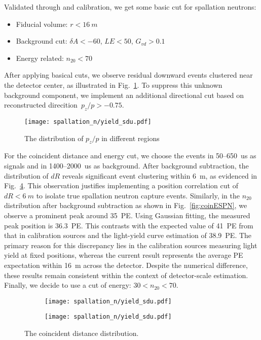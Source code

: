 Validated through  and  calibration, we get some basic cut for spallation neutrons:
\begin{itemize}
	\item Fiducial volume: $r<\SI{16}{m}$
	\item Background cut: $\delta A<-60$, $LE<50$, $G_{vd}>0.1$
	\item Energy related: $n_{20}<70$
\end{itemize}

After applying basical cuts, we observe residual downward events clustered near the detector center, as illustrated in Fig.~\ref{fig:pzcut}. To suppress this unknown background component, we implement an additional directional cut based on reconstructed direcition~$p_z/p>-0.75$.

\begin{figure}[htbp]
	\centering
	\texttt{[image: spallation\_n/yield\_sdu.pdf]}
	\caption{The distribution of $p_z/p$ in different regions}
	\label{fig:pzcut}
\end{figure}

For the coincident distance and energy cut, we choose the events in 50--\SI{650}{us} as signals and in 1400--\SI{2000}{us} as background.
After background subtraction, the distribution of $dR$ reveals significant event clustering within \SI{6}{m}, as evidenced in Fig.~\ref{fig:coinDisSPN}. This observation justifies implementing a position correlation cut of $dR<\SI{6}{m}$ to isolate true spallation neutron capture events. Similarly, in the $n_{20}$ distribution after background subtraction as shown in Fig.~\ref{fig:coinESPN}, we observe a prominent peak around \SI{35}{PE}. Using Gaussian fitting, the measured peak position is \SI{36.3}{PE}. This contrasts with the expected value of \SI{41}{PE} from that in calibration sources and the light-yield curve estimation of \SI{38.9}{PE}. The primary reason for this discrepancy lies in the calibration sources measuring light yield at fixed positions, whereas the current result represents the average PE expectation within \SI{16}{m} across the detector. Despite the numerical difference, these results remain consistent within the context of detector-scale estimation. Finally, we decide to use a cut of energy: $30<n_{20}<70$.
\begin{figure}[htbp]
	\centering
	\begin{subfigure}{0.5\textwidth}
		\centering
		\texttt{[image: spallation\_n/yield\_sdu.pdf]}
		\caption{}
		\label{fig:coinDisSPN0}
	\end{subfigure}%
	\begin{subfigure}{0.5\textwidth}
		\centering
		\texttt{[image: spallation\_n/yield\_sdu.pdf]}
		\caption{}
		\label{fig:coinDisSPN1}
	\end{subfigure}
	\caption{The coincident distance distribution.}
	\label{fig:coinDisSPN}
\end{figure}

